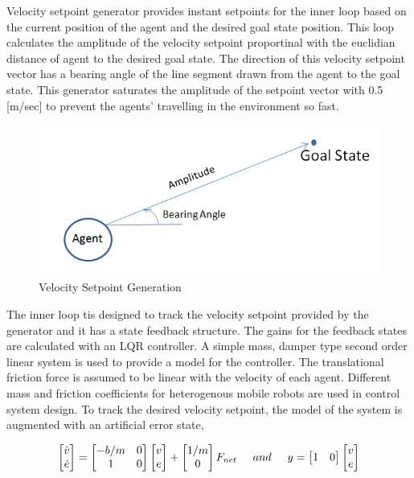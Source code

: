 Velocity setpoint generator provides instant setpoints for the inner loop based on the current position of the agent and the desired goal state position.  This loop calculates the amplitude of the velocity setpoint proportinal with the euclidian distance of agent to the desired goal state. The direction of this velocity setpoint vector has a bearing angle of the line segment drawn from the agent to the goal state. This generator saturates the amplitude of the setpoint vector with 0.5 [m/sec] to prevent the agents' travelling in the environment so fast. 

\begin{figure}[H]
\caption{Velocity Setpoint Generation}
\centering
\includegraphics[scale = 0.50]{bearing}
\end{figure}

The inner loop tis designed to track the velocity setpoint provided by the generator and it has a state feedback structure. The gains for the feedback states are calculated with an LQR controller. A simple mass, damper type second order linear system is used to provide a model for the controller. The translational friction force is assumed to be linear with the velocity of each agent. Different mass and friction coefficients for heterogenous mobile robots are used in control system design. To track the desired velocity setpoint, the model of the system is augmented with an artificial error state,

\begin{equation}
\begin{bmatrix}
\dot{v} \\ \dot{e}
\end{bmatrix}
=
\begin{bmatrix}
-b/m & 0 \\
1 & 0
\end{bmatrix}
\begin{bmatrix}
v \\ e
\end{bmatrix}
+ \begin{bmatrix}
1/m \\ 0
\end{bmatrix}
F_{net} \hspace{0.5cm} and
\hspace{0.5cm}
y = \begin{bmatrix}
1 & 0
\end{bmatrix}
\begin{bmatrix}
v \\ e
\end{bmatrix}
\end{equation}

